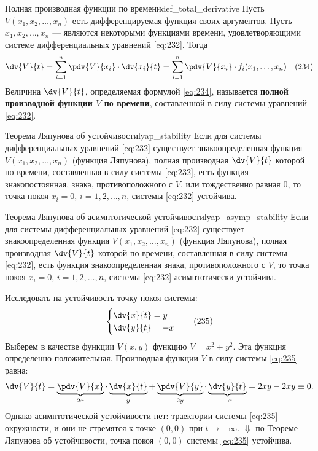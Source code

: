 \begin{definition}{Полная производная функции по времени}{def_total_derivative}
	Пусть $V(x_1, x_2, \dots, x_n)$ есть дифференцируемая функция своих аргументов. Пусть $x_1, x_2, \dots, x_n$ --- являются некоторыми функциями времени, удовлетворяющими системе дифференциальных уравнений \eqref{eq:232}. Тогда
	\begin{equation} \label{eq:234}
		\dv{V}{t} = \sum_{i=1}^{n} \pdv{V}{x_i} \cdot \dv{x_i}{t} = \sum_{i=1}^{n} \pdv{V}{x_i} \cdot f_i(x_1, \dots, x_n) \quad (234)
	\end{equation}
	Величина $\dv{V}{t}$, определяемая формулой \eqref{eq:234}, называется \textbf{полной производной функции $V$ по времени}, составленной в силу системы уравнений \eqref{eq:232}.
\end{definition}

\begin{theorem}{Теорема Ляпунова об устойчивости}{lyap_stability}
	Если для системы дифференциальных уравнений \eqref{eq:232} существует знакоопределенная функция $V(x_1, x_2, \dots, x_n)$ (функция Ляпунова), полная производная $\dv{V}{t}$ которой по времени, составленная в силу системы \eqref{eq:232}, есть функция знакопостоянная, знака, противоположного с $V$, или тождественно равная $0$, то точка покоя $x_i = 0$, $i=1,2,\dots,n$, системы \eqref{eq:232} устойчива.
\end{theorem}

\begin{theorem}{Теорема Ляпунова об асимптотической устойчивости}{lyap_asymp_stability}
	Если для системы дифференциальных уравнений \eqref{eq:232} существует знакоопределенная функция $V(x_1, x_2, \dots, x_n)$ (функция Ляпунова), полная производная $\dv{V}{t}$ которой по времени, составленная в силу системы \eqref{eq:232}, есть функция знакоопределенная знака, противоположного с $V$, то точка покоя $x_i = 0$, $i=1,2,\dots,n$, системы \eqref{eq:232} асимптотически устойчива.
\end{theorem}

\begin{example}
	Исследовать на устойчивость точку покоя системы:
	\begin{equation} \label{eq:235}
		\begin{cases}
			\dv{x}{t} = y \\
			\dv{y}{t} = -x
		\end{cases} \quad (235)
	\end{equation}
	Выберем в качестве функции $V(x,y)$ функцию $V = x^2 + y^2$.
	Эта функция определенно-положительная.
	Производная функции $V$ в силу системы \eqref{eq:235} равна:
	\begin{equation*}
		\dv{V}{t} = \underbrace{\pdv{V}{x}}_{2x} \cdot \underbrace{\dv{x}{t}}_{y} + \underbrace{\pdv{V}{y}}_{2y} \cdot \underbrace{\dv{y}{t}}_{-x} = 2xy - 2xy \equiv 0.
	\end{equation*}
	Однако асимптотической устойчивости нет: траектории системы \eqref{eq:235} --- окружности, и они не стремятся к точке $(0,0)$ при $t \to +\infty$.
	$\Downarrow$
	по Теореме Ляпунова об устойчивости, точка покоя $(0,0)$ системы \eqref{eq:235} устойчива.
\end{example}

